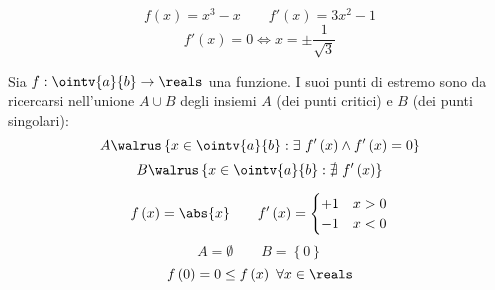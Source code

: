 \begin{example}
  $$f\left( x \right)=x^3-x\qquad f'\left( x \right)=3x^2-1$$
  $$f'\left( x \right)=0\iff x=\pm\frac{1}{\sqrt{3}}$$
\end{example}


\begin{corollary}
  Sia $f:\ointv{a}{b}\to\reals$ una funzione. I suoi punti di estremo sono da ricercarsi nell'unione $A\cup B$ degli insiemi $A$ (dei punti critici) e $B$ (dei punti singolari):
  $$A\walrus\left\{ x\in\ointv{a}{b}:\exists\ f'\left( x \right)\wedge f'\left( x \right)=0 \right\}$$
  $$B\walrus\left\{ x\in\ointv{a}{b}:\nexists\ f'\left( x \right) \right\}$$
\end{corollary}

\begin{example}
  $$
    f\left( x \right)=\abs{x}
    \qquad
    f'\left( x \right)=
    \begin{cases}
      +1 & x>0 \\
      -1 & x<0 \\
    \end{cases}
  $$
  $$A=\emptyset\qquad B=\left\{ 0 \right\}$$
  $$f\left( 0 \right)=0\le f\left( x \right)\ \forall x\in\reals$$
\end{example}


